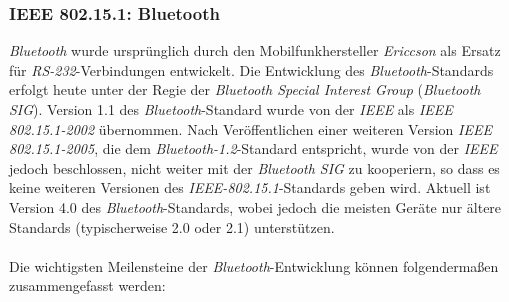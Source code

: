         \subsubsection{IEEE 802.15.1: Bluetooth}\label{Bluetooth}
                \emph{Bluetooth} wurde ursprünglich durch den Mobilfunkhersteller \emph{Ericcson} als Ersatz für
                \emph{RS-232}-Verbindungen entwickelt. Die Entwicklung des \emph{Bluetooth}-Standards erfolgt
                heute unter der Regie der \emph{Bluetooth Special Interest Group} (\emph{Bluetooth SIG}).
                Version 1.1 des \emph{Bluetooth}-Standard wurde 
                von der \emph{IEEE} als \emph{IEEE 802.15.1-2002} übernommen. Nach Veröffentlichen einer
                weiteren Version \emph{IEEE 802.15.1-2005}, die dem \emph{Bluetooth-1.2}-Standard entspricht,
                wurde von der \emph{IEEE} jedoch beschlossen, nicht weiter mit der \emph{Bluetooth SIG}
                zu kooperiern, so dass es keine weiteren Versionen des \emph{IEEE-802.15.1}-Standards 
                geben wird. Aktuell ist Version 4.0 des \emph{Bluetooth}-Standards, wobei jedoch die
                meisten Geräte nur ältere Standards (typischerweise 2.0 oder 2.1) unterstützen. \cite{Bluetooth} 
                \\
                    \\
                Die wichtigsten Meilensteine der \emph{Bluetooth}-Entwicklung können folgendermaßen
                zusammengefasst werden:

